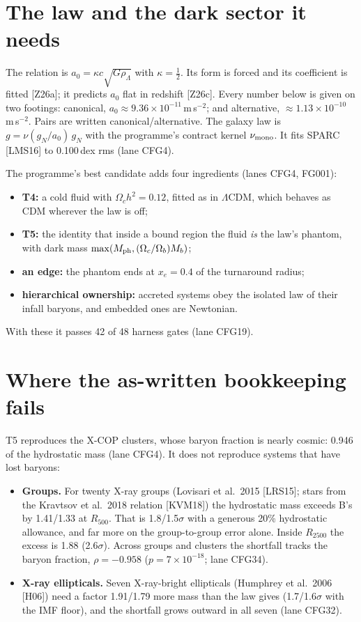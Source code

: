 \documentclass[10pt]{article}
\begin{document}
\section{The law and the dark sector it needs}\label{sec:law}

The relation is $a_0=\kappa c\sqrt{G\rho_\Lambda}$ with $\kappa=\tfrac12$. Its form is forced and its coefficient is fitted [Z26a]; it predicts $a_0$ flat in redshift [Z26c]. Every number below is given on two footings: canonical, $a_0\approx9.36\times10^{-11}$\,m\,s$^{-2}$; and alternative, $\approx1.13\times10^{-10}$\,m\,s$^{-2}$. Pairs are written canonical/alternative. The galaxy law is $g=\nu(g_N/a_0)\,g_N$ with the programme's contract kernel $\nu_{\rm mono}$. It fits SPARC [LMS16] to 0.100\,dex rms (lane CFG4).

The programme's best candidate adds four ingredients (lanes CFG4, FG001):
\begin{itemize}
\item \textbf{T4:} a cold fluid with $\Omega_ch^2=0.12$, fitted as in $\Lambda$CDM, which behaves as CDM wherever the law is off;
\item \textbf{T5:} the identity that inside a bound region the fluid \emph{is} the law's phantom, with dark mass $\max(M_{\rm ph},(\Omega_c/\Omega_b)M_b)$;
\item \textbf{an edge:} the phantom ends at $x_e=0.4$ of the turnaround radius;
\item \textbf{hierarchical ownership:} accreted systems obey the isolated law of their infall baryons, and embedded ones are Newtonian.
\end{itemize}
With these it passes 42 of 48 harness gates (lane CFG19).

\section{Where the as-written bookkeeping fails}\label{sec:fail}

T5 reproduces the X-COP clusters, whose baryon fraction is nearly cosmic: 0.946 of the hydrostatic mass (lane CFG4). It does not reproduce systems that have lost baryons:
\begin{itemize}
\item \textbf{Groups.} For twenty X-ray groups (Lovisari et al.\ 2015 [LRS15]; stars from the Kravtsov et al.\ 2018 relation [KVM18]) the hydrostatic mass exceeds B's by 1.41/1.33 at $R_{500}$. That is 1.8/1.5$\sigma$ with a generous 20\% hydrostatic allowance, and far more on the group-to-group error alone. Inside $R_{2500}$ the excess is 1.88 (2.6$\sigma$). Across groups and clusters the shortfall tracks the baryon fraction, $\rho=-0.958$ ($p=7\times10^{-18}$; lane CFG34).
\item \textbf{X-ray ellipticals.} Seven X-ray-bright ellipticals (Humphrey et al.\ 2006 [H06]) need a factor 1.91/1.79 more mass than the law gives (1.7/1.6$\sigma$ with the IMF floor), and the shortfall grows outward in all seven (lane CFG32).
\end{itemize}
\end{document}
